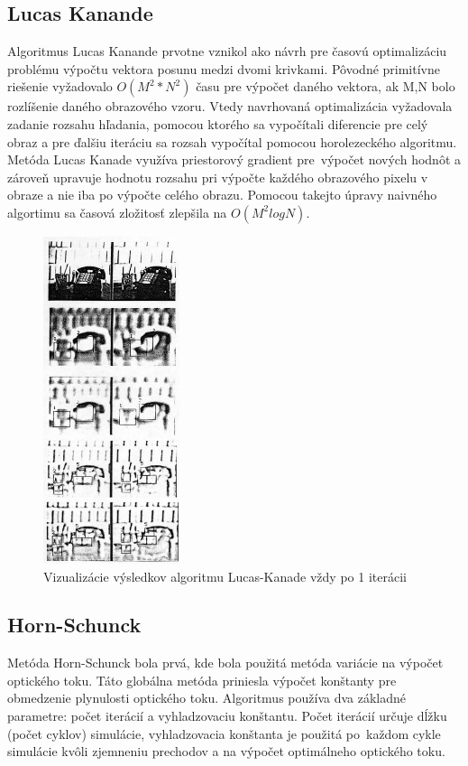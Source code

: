 \subsection{Lucas Kanande}
Algoritmus Lucas Kanande\cite{lucas-kanade} prvotne vznikol ako návrh pre časovú optimalizáciu problému výpočtu vektora posunu medzi dvomi krivkami.
Pôvodné primitívne riešenie vyžadovalo \begin{math} O(M^2 * N^2) \end{math} času pre výpočet daného vektora, ak M,N bolo rozlíšenie daného obrazového vzoru.
Vtedy navrhovaná optimalizácia vyžadovala zadanie rozsahu hľadania, pomocou ktorého sa vypočítali diferencie pre celý obraz a pre ďalšiu iteráciu sa rozsah vypočítal pomocou horolezeckého algoritmu.
Metóda Lucas Kanade využíva priestorový gradient pre~výpočet nových hodnôt a zároveň upravuje hodnotu rozsahu pri výpočte každého obrazového pixelu v obraze a nie iba po výpočte celého obrazu.
Pomocou takejto úpravy naivného algortimu sa časová zložitosť zlepšila na \begin{math} O(M^2 log N) \end{math}\cite{lucas-kanade}.

\begin{figure}[H]
  \centering
  \includegraphics[width=4cm]{pics/lukas-kanade.jpg}
  \caption{Vizualizácie výsledkov algoritmu Lucas-Kanade vždy po 1 iterácii\cite{lucas-kanade}}
\end{figure}
\vspace{10mm}

\subsection{Horn-Schunck}
Metóda Horn-Schunck\cite{hs-original} bola prvá, kde bola použitá metóda variácie na výpočet optického toku.
Táto globálna metóda priniesla výpočet  konštanty pre obmedzenie plynulosti optického toku.
Algoritmus používa dva základné parametre: počet iterácií a vyhladzovaciu konštantu.
Počet iterácií určuje dĺžku (počet cyklov) simulácie, vyhladzovacia konštanta je použitá po~každom cykle simulácie kvôli zjemneniu prechodov a na výpočet optimálneho optického toku.

